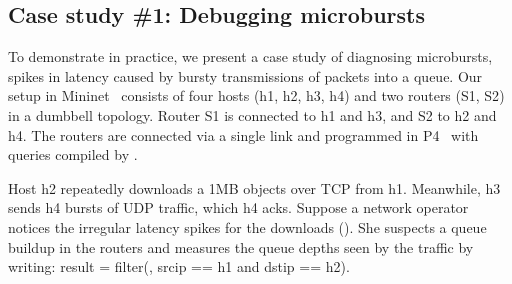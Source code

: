 \subsection{Case study \#1: Debugging microbursts}
\label{s:eval:mininet}
\label{sec:eval:mininet}

To demonstrate \TheSystem in practice, we present a case study of
diagnosing microbursts, \ie spikes in latency caused by bursty
transmissions of packets into a queue.
Our setup in Mininet~\cite{mininet} consists of four hosts
({\ct h1, h2, h3, h4}) and two routers ({\ct S1, S2}) in a dumbbell topology.
Router {\ct S1} is connected to {\ct h1} and {\ct h3},
and {\ct S2} to {\ct h2} and {\ct h4}.
The routers are connected via a single link and
programmed in P4~\cite{p4-bmv2} with queries compiled by \TheSystem.

Host {\ct h2} repeatedly downloads a 1MB objects over TCP from {\ct h1}.
Meanwhile, {\ct h3} sends {\ct h4} bursts of UDP traffic, which
{\ct h4} acks.  Suppose a network operator notices the irregular latency
spikes for the downloads (). She suspects a queue buildup
in the routers and measures the queue depths seen by the traffic by writing:
{\ct result = filter(\pktlog, srcip == h1 and dstip == h2).}


